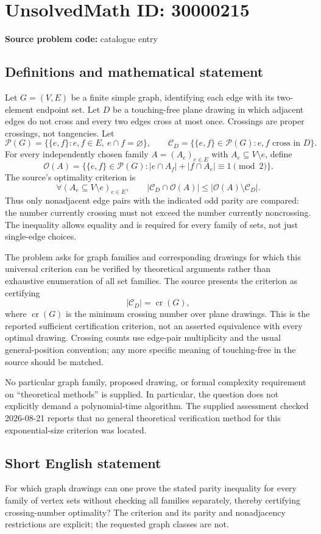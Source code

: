 \documentclass[11pt]{article}
\begin{document}
\section*{UnsolvedMath ID: 30000215}
\textbf{Source problem code:} catalogue entry
\subsection{Definitions and mathematical statement}
Let \(G=(V,E)\) be a finite simple graph, identifying each edge with its two-element endpoint set. Let \(D\) be a touching-free plane drawing in which adjacent edges do not cross and every two edges cross at most once. Crossings are proper crossings, not tangencies. Let
\[
\mathcal P(G)=\{\{e,f\}:e,f\in E,\ e\cap f=\varnothing\},
\qquad
\mathcal C_D=\{\{e,f\}\in\mathcal P(G):e,f\text{ cross in }D\}.
\]
For every independently chosen family \(A=(A_e)_{e\in E}\) with \(A_e\subseteq V\setminus e\), define
\[
\mathcal O(A)=\{\{e,f\}\in\mathcal P(G):|e\cap A_f|+|f\cap A_e|\equiv1\pmod2\}.
\]
The source's optimality criterion is
\[
\forall (A_e\subseteq V\setminus e)_{e\in E},\qquad
|\mathcal C_D\cap\mathcal O(A)|\leq|\mathcal O(A)\setminus\mathcal C_D|.
\]
Thus only nonadjacent edge pairs with the indicated odd parity are compared: the number currently crossing must not exceed the number currently noncrossing. The inequality allows equality and is required for every family of sets, not just single-edge choices.

The problem asks for graph families and corresponding drawings for which this universal criterion can be verified by theoretical arguments rather than exhaustive enumeration of all set families. The source presents the criterion as certifying
\[
|\mathcal C_D|=\operatorname{cr}(G),
\]
where \(\operatorname{cr}(G)\) is the minimum crossing number over plane drawings. This is the reported sufficient certification criterion, not an asserted equivalence with every optimal drawing. Crossing counts use edge-pair multiplicity and the usual general-position convention; any more specific meaning of touching-free in the source should be matched.

No particular graph family, proposed drawing, or formal complexity requirement on ``theoretical methods'' is supplied. In particular, the question does not explicitly demand a polynomial-time algorithm. The supplied assessment checked 2026-08-21 reports that no general theoretical verification method for this exponential-size criterion was located.
\subsection{Short English statement}
For which graph drawings can one prove the stated parity inequality for every family of vertex sets without checking all families separately, thereby certifying crossing-number optimality? The criterion and its parity and nonadjacency restrictions are explicit; the requested graph classes are not.
\end{document}

